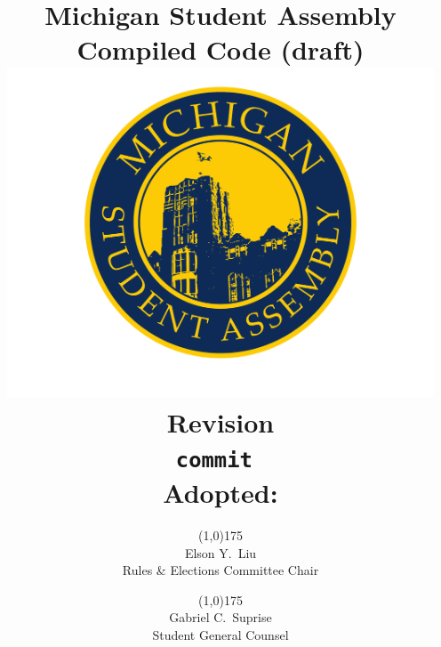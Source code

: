 \documentclass{code}
\begin{document}
	\renewcommand{\thepage}{\roman{page}}
	\title{Michigan Student Assembly Compiled Code (draft) \\
			\large \includegraphics[width=5in]{2008_msa_color_logo} \\
			Revision  \\
			{\tt commit \GITAbrHash} \\
			Adopted: }
	\author{\line(1,0){175} \\
			Elson Y.~Liu \\
			Rules \& Elections Committee Chair
				\and
			\line(1,0){175} \\
			Gabriel C.~Suprise \\
			Student General Counsel}
	\date{}
	\maketitle
	\tableofcontents
	\newpage

	\renewcommand{\thepage}{\arabic{page}}
	\setcounter{page}{1}
	\pagestyle{fancy}
	\headheight 35pt
	\thispagestyle{empty}
	\linenumbers

	
	
	
	
	
	
	
	
	
	
	
	
	
\end{document}
